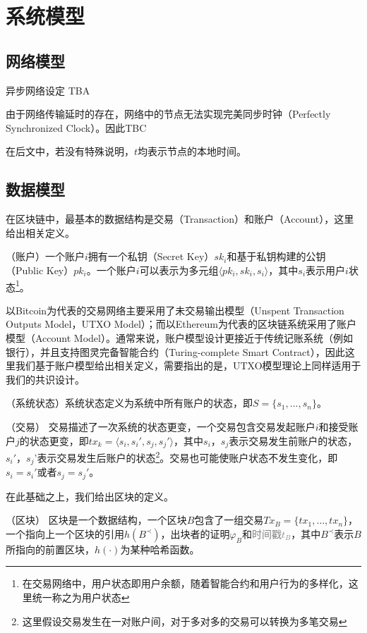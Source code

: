 \section{系统模型}
\subsection{网络模型}
异步网络设定 TBA

由于网络传输延时的存在，网络中的节点无法实现完美同步时钟（Perfectly Synchronized Clock）。因此TBC

在后文中，若没有特殊说明，$t$均表示节点的本地时间。

\subsection{数据模型}
在区块链中，最基本的数据结构是交易（Transaction）和账户（Account），这里给出相关定义。

\begin{definition}
（账户）一个账户$i$拥有一个私钥（Secret Key）$sk_i$和基于私钥构建的公钥（Public Key）$pk_i$。一个账户$i$可以表示为多元组$\langle pk_i,sk_i,s_i\rangle$，其中$s_i$表示用户$i$状态\footnote{在交易网络中，用户状态即用户余额，随着智能合约和用户行为的多样化，这里统一称之为用户状态}。
\end{definition}

以Bitcoin为代表的交易网络主要采用了未交易输出模型（Unspent Transaction Outputs Model，UTXO Model）；而以Ethereum为代表的区块链系统采用了账户模型（Account Model）。通常来说，账户模型设计更接近于传统记账系统（例如银行），并且支持图灵完备智能合约（Turing-complete Smart Contract），因此这里我们基于账户模型给出相关定义，需要指出的是，UTXO模型理论上同样适用于我们的共识设计。

\begin{definition}
（系统状态）系统状态定义为系统中所有账户的状态，即$S=\{s_1,...,s_n\}$。
\end{definition}

\begin{definition}
（交易） 交易描述了一次系统的状态更变，一个交易包含交易发起账户$i$和接受账户$j$的状态更变，即$tx_k=\langle s_i,s_i',s_j,s_j'\rangle$，其中$s_i$，$s_j$表示交易发生前账户的状态，$s_i'$，$s_j’$表示交易发生后账户的状态\footnote{这里假设交易发生在一对账户间，对于多对多的交易可以转换为多笔交易}。交易也可能使账户状态不发生变化，即$s_i=s_i'$或者$s_j=s_j'$。
\end{definition}

在此基础之上，我们给出区块的定义。

\begin{definition}
\label{def:block}
（区块） 区块是一个数据结构，一个区块$B$包含了一组交易$Tx_B=\{tx_1,\dots,tx_n\}$，一个指向上一个区块的引用$h(B^{\prec})$，出块者的证明$\varphi_B$和\textcolor{gray}{时间戳$t_B$}，其中$B^{\prec}$表示$B$所指向的前置区块，$h(\cdot)$为某种哈希函数。
\end{definition}



